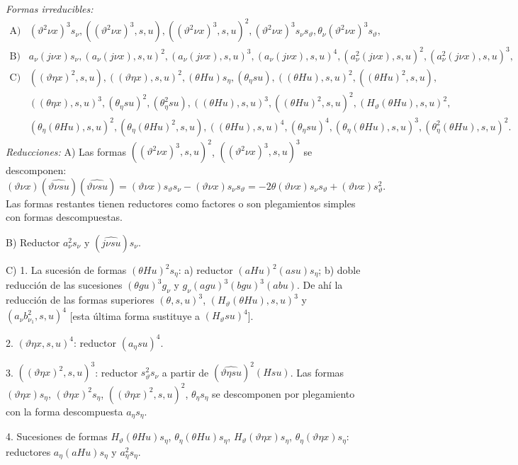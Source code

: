 \documentclass[11pt]{article}
\begin{document}
\noindent\emph{Formas irreducibles:}
\[
\begin{array}{rl}
\text{A)}& (\vartheta^2\nu x)^3s_\nu,
((\vartheta^2\nu x)^3,s,u),
((\vartheta^2\nu x)^3,s,u)^2,
(\vartheta^2\nu x)^3s_\nu s_\vartheta,
\theta_\nu(\vartheta^2\nu x)^3s_\vartheta,\\[0.3em]
\text{B)}& a_\nu(j\nu x)s_\nu,
(a_\nu(j\nu x),s,u)^2,
(a_\nu(j\nu x),s,u)^3,
(a_\nu(j\nu x),s,u)^4,
(a_\nu^2(j\nu x),s,u)^2,
(a_\nu^2(j\nu x),s,u)^3,\\[0.3em]
\text{C)}& ((\vartheta\eta x)^2,s,u),
((\vartheta\eta x),s,u)^2,
(\theta Hu)s_\eta,
(\theta_\eta su),
((\theta Hu),s,u)^2,
((\theta Hu)^2,s,u),\\
& ((\theta\eta x),s,u)^3,
(\theta_\eta su)^2,
(\theta_\eta^2su),
((\theta Hu),s,u)^3,
((\theta Hu)^2,s,u)^2,
(H_\vartheta(\theta Hu),s,u)^2,\\
& (\theta_\eta(\theta Hu),s,u)^2,
(\theta_\eta(\theta Hu)^2,s,u),
((\theta Hu),s,u)^4,
(\theta_\eta su)^4,
(\theta_\eta(\theta Hu),s,u)^3,
(\theta_\eta^2(\theta Hu),s,u)^2.
\end{array}
\]
\noindent\emph{Reducciones:}
A) Las formas $((\vartheta^2\nu x)^3,s,u)^2$, $((\vartheta^2\nu x)^3,s,u)^3$ se descomponen:
\[
(\vartheta\nu x)(\widehat{\vartheta\nu su})(\widehat{\vartheta\nu su})=(\vartheta\nu x)s_\vartheta s_\nu-(\vartheta\nu x)s_\nu s_\vartheta=-2\theta(\vartheta\nu x)s_\nu s_\vartheta+(\vartheta\nu x)s_\vartheta^2.
\]
Las formas restantes tienen reductores como factores o son plegamientos simples con formas descompuestas.

B) Reductor $a_\nu^2s_\nu$ y $(\widehat{j\nu su})s_\nu$.

C) 1. La sucesión de formas $(\theta Hu)^2s_\eta$: a) reductor $(aHu)^2(asu)s_\eta$; b) doble reducción de las sucesiones $(\theta gu)^3g_\nu$ y $g_\nu(agu)^3(bgu)^3(abu)$. De ahí la reducción de las formas superiores $(\theta,s,u)^3$, $(H_\vartheta(\theta Hu),s,u)^3$ y $(a_\nu b_{\nu_1}^2,s,u)^4$ [esta última forma sustituye a $(H_\vartheta su)^4$].

2. $(\vartheta\eta x,s,u)^4$: reductor $(a_\eta su)^4$.

3. $((\vartheta\eta x)^2,s,u)^3$: reductor $s_\vartheta^2s_\nu$ a partir de $(\widehat{\vartheta\eta su})^2(Hsu)$. Las formas $(\vartheta\eta x)s_\eta$, $(\vartheta\eta x)^2s_\eta$, $((\vartheta\eta x)^2,s,u)^2$, $\theta_\eta s_\eta$ se descomponen por plegamiento con la forma descompuesta $a_\eta s_\eta$.

4. Sucesiones de formas $H_\vartheta(\theta Hu)s_\eta$, $\theta_\eta(\theta Hu)s_\eta$, $H_\vartheta(\vartheta\eta x)s_\eta$, $\theta_\eta(\vartheta\eta x)s_\eta$: reductores $a_\eta(aHu)s_\eta$ y $a_\eta^2s_\eta$.
\end{document}
